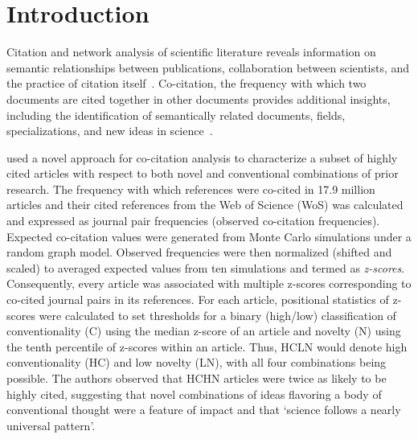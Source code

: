 \documentclass[NETN]{stjour}
\begin{document}
\section{Introduction}

Citation and network analysis of  scientific literature reveals information on semantic relationships between publications, collaboration between scientists, and the practice of citation itself~\citep{garfield_citation_1955,de_solla_price_networks_1965,newman_structure_2001,Shi:2010:CHI:1816123.1816131,patience_pmid28560354}. Co-citation, the frequency with which two documents are cited together in other documents provides additional insights, including the identification of semantically related documents, fields, specializations, and new ideas in science~\citep{small_co-citation_1973, marshakova-shaikevich_co-citation_1973,boyack_co-citation_2010, 10.3389/frma.2018.00020}. 

\cite{uzzi_atypical_2013} used a novel approach for co-citation analysis to characterize a subset of highly cited articles with respect to both novel and conventional combinations of prior research. The frequency with which references were co-cited  in 17.9 million articles and their cited references from the Web of Science (WoS) was calculated and expressed as journal pair frequencies (observed co-citation frequencies). Expected co-citation values were generated from Monte Carlo simulations under a random graph model. Observed frequencies were then normalized (shifted and scaled) to averaged expected values from ten simulations and termed as \emph{z-scores}. Consequently, every article was associated with multiple z-scores corresponding to co-cited journal pairs in its references. For each article, positional statistics of z-scores were calculated to set thresholds for a binary (high/low) classification of conventionality (C) using the median z-score of an article and novelty (N) using the tenth percentile of z-scores within an article. Thus, HCLN would denote high conventionality (HC) and low novelty (LN), with all four combinations being possible. The authors observed that HCHN articles were twice as likely to be highly cited, suggesting that novel combinations of ideas flavoring a body of conventional thought were a feature of impact and that `science follows a nearly universal pattern'.
\end{document}
